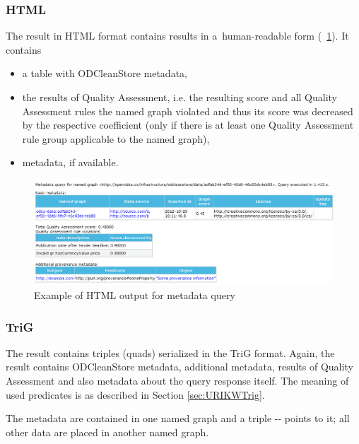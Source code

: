 {\subsubsection{HTML}

The result in HTML format contains results in a~human-readable form (\figurename~\ref{fig:metadataQuery}). It contains

\begin{itemize}
  \item a table with ODCleanStore metadata,
  \item the results of Quality Assessment, i.e. the resulting score and all Quality Assessment rules the named graph violated and thus its score was decreased by the respective coefficient (only if there is at least one Quality Assessment rule group applicable to the named graph),
  \item {} metadata, if available.
\end{itemize}

\begin{figure}[htb]
    \centering
    \includegraphics[width=\textwidth]{images/metadata-query-screenshot.png}
    \caption{Example of HTML output for metadata query}
	\label{fig:metadataQuery}
\end{figure}

\subsubsection{TriG}
\label{sec:metadataTriG}
The result contains triples (quads) serialized in the TriG format. Again, the result contains ODCleanStore metadata, additional  metadata, results of Quality Assessment and also metadata about the query response itself. The meaning of used predicates is as described in Section \ref{sec:URIKWTrig}.

The  metadata are contained in one named graph and a triple -- points to it; all other data are placed in another named graph.

}
